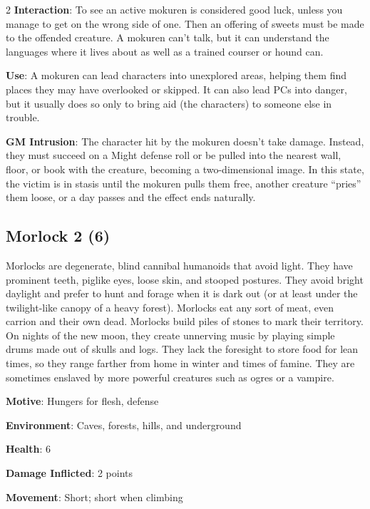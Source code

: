 \begin{multicols}{2}
\textbf{Interaction}: To see an active mokuren is considered good luck, unless you manage to get on the wrong side of one. Then an offering of sweets must be made to the offended creature. A mokuren can’t talk, but it can understand the languages where it lives about as well as a trained courser or hound can.

\textbf{Use}: A mokuren can lead characters into unexplored areas, helping them find places they may have overlooked or skipped. It can also lead PCs into danger, but it usually does so only to bring aid (the characters) to someone else in trouble.

\textbf{GM Intrusion}: The character hit by the mokuren doesn’t take damage. Instead, they must succeed on a Might defense roll or be pulled into the nearest wall, floor, or book with the creature, becoming a two-dimensional image. In this state, the victim is in stasis until the mokuren pulls them free, another creature “pries” them loose, or a day passes and the effect ends naturally.

\subsection{Morlock 2 (6)}

Morlocks are degenerate, blind cannibal humanoids that avoid light. They have prominent teeth, piglike eyes, loose skin, and stooped postures. They avoid bright daylight and prefer to hunt and forage when it is dark out (or at least under the twilight-like canopy of a heavy forest). Morlocks eat any sort of meat, even carrion and their own dead. Morlocks build piles of stones to mark their territory. On nights of the new moon, they create unnerving music by playing simple drums made out of skulls and logs. They lack the foresight to store food for lean times, so they range farther from home in winter and times of famine. They are sometimes enslaved by more powerful creatures such as ogres or a vampire. 

\textbf{Motive}: Hungers for flesh, defense 

\textbf{Environment}: Caves, forests, hills, and underground 

\textbf{Health}: 6 

\textbf{Damage Inflicted}: 2 points 

\textbf{Movement}: Short; short when climbing 


\end{multicols}
